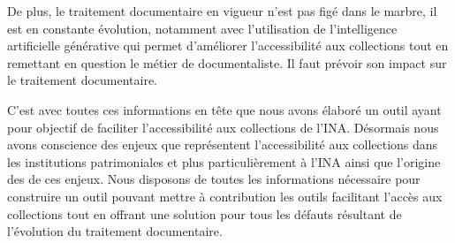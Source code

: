 
De plus, le traitement documentaire en vigueur n'est pas figé dans le marbre, il est en constante évolution, notamment avec l'utilisation de l'intelligence artificielle générative  qui permet d'améliorer l'accessibilité aux collections tout en remettant en question le métier de documentaliste. Il faut prévoir son impact sur le traitement documentaire.   


C'est avec toutes ces informations en tête que nous avons élaboré un outil ayant pour objectif de faciliter l'accessibilité aux collections de l'INA. Désormais nous avons conscience des enjeux que représentent l’accessibilité aux collections dans les institutions patrimoniales et plus particulièrement à l'INA ainsi que l'origine des de ces enjeux. Nous disposons de toutes les informations nécessaire pour construire un outil pouvant mettre à contribution les outils facilitant l'accès aux collections tout en offrant une solution pour tous les défauts résultant de l'évolution du traitement documentaire. 
